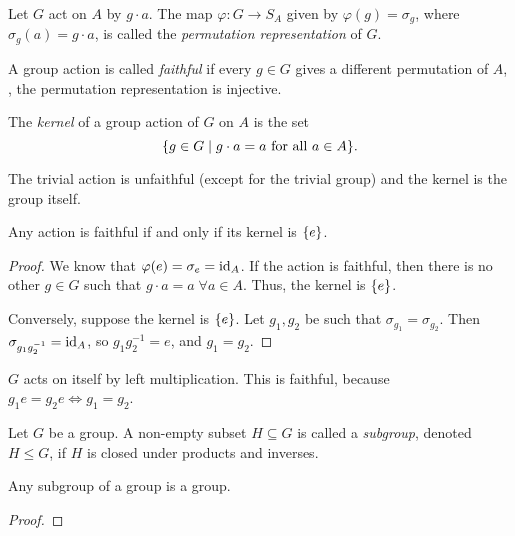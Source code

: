 \begin{definition} \label{def:perm_rep}
    Let $G$ act on $A$ by $g \cdot a$.
    The map $\varphi\colon G \to S_A$ given by $\varphi(g) = \sigma_g$,
    where $\sigma_g(a) = g \cdot a$, is called the \emph{permutation
    representation} of $G$.
\end{definition}

\begin{definition}[Faith] \label{def:group_actions:faith}
    A group action is called \emph{faithful} if every $g \in G$ gives a
    different permutation of $A$, \ie, the permutation representation
    is injective.
\end{definition}

\begin{definition}[Kernel] \label{def:group_actions:kernel}
    The \emph{kernel} of a group action of $G$ on $A$ is the set \[
        \set{g \in G \mid g \cdot a = a \text{ for all } a \in A}.
    \]
\end{definition}

\begin{example}
    The trivial action is unfaithful (except for the trivial group)
    and the kernel is the group itself.
\end{example}
\begin{proposition}
    Any action is faithful if and only if its kernel is $\set{e}$.
\end{proposition}
\begin{proof}
    We know that $\varphi(e) = \sigma_e = \mathrm{id}_A$.
    If the action is faithful, then there is no other $g \in G$ such that
    $g \cdot a = a \;\forall a \in A$.
    Thus, the kernel is $\set{e}$.

    Conversely, suppose the kernel is $\set{e}$.
    Let $g_1, g_2$ be such that $\sigma_{g_1} = \sigma_{g_2}$.
    Then $\sigma_{g_1 g_2^{-1}} = \mathrm{id}_A$, so $g_1 g_2^{-1} = e$,
    and $g_1 = g_2$.
\end{proof}

\begin{example}
    $G$ acts on itself by left multiplication.
    This is faithful, because $g_1 e = g_2 e \iff g_1 = g_2$.
\end{example}

\begin{definition*}[Subgroup] \label{def:group_actions:subgroup}
    Let $G$ be a group.
    A non-empty subset $H \subseteq G$ is called a \emph{subgroup},
    denoted $H \le G$, if $H$ is closed under products and inverses.
\end{definition*}
\begin{proposition}
    Any subgroup of a group is a group.
\end{proposition}
\begin{proof}
    
\end{proof}

